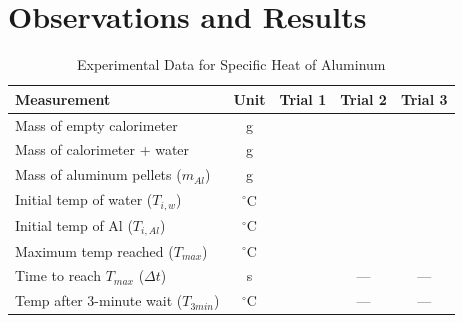 \documentclass{article}
\begin{document}
\section{Observations and Results}

\renewcommand{\arraystretch}{1.6} 

\begin{table}[h]
\centering
\caption{Experimental Data for Specific Heat of Aluminum}
\begin{tabular}{|p{6cm}|c|c|c|c|}
\hline
\textbf{Measurement} & \textbf{Unit} & \textbf{Trial 1} & \textbf{Trial 2} & \textbf{Trial 3} \\ \hline
Mass of empty calorimeter & g & & & \\ \hline
Mass of calorimeter + water & g & & & \\ \hline
Mass of aluminum pellets ($m_{Al}$) & g & & & \\ \hline
Initial temp of water ($T_{i,w}$) & $^\circ$C & & & \\ \hline
Initial temp of Al ($T_{i,Al}$) & $^\circ$C & & & \\ \hline
Maximum temp reached ($T_{max}$) & $^\circ$C & & & \\ \hline
Time to reach $T_{max}$ ($\Delta t$) & s & & --- & --- \\ \hline
Temp after 3-minute wait ($T_{3min}$) & $^\circ$C & & --- & --- \\ \hline
\end{tabular}
\end{table}

\renewcommand{\arraystretch}{1.0} %
\end{document}
